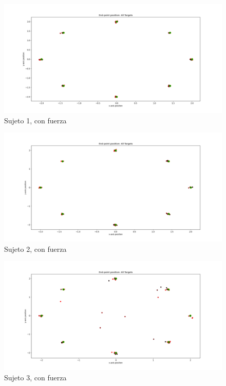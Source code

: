 \documentclass[a4paper,11pt, oneside]{book}
\begin{document}
\begin{figure}[H]
	\includegraphics[width=\linewidth]{sujeto1/force/trayectorias_puntos}
	\caption{Sujeto 1, con fuerza}
	\label{1-2-1}
\end{figure}
\begin{figure}[H]
	\includegraphics[width=\linewidth]{sujeto2/force/trayectorias_puntos}
	\caption{Sujeto 2, con fuerza}
	\label{2-2-1}
\end{figure}
\begin{figure}[H]
	\includegraphics[width=\linewidth]{sujeto3/force/trayectorias_puntos}
	\caption{Sujeto 3, con fuerza}
	\label{3-2-1}
\end{figure}
\end{document}
